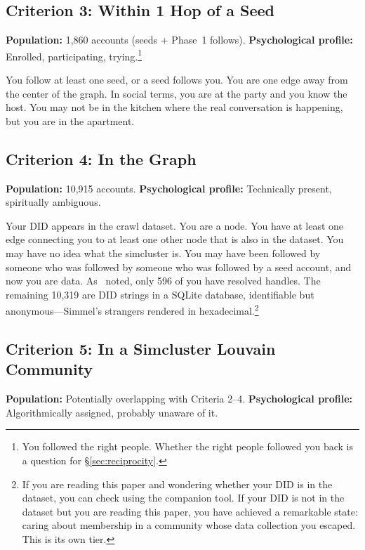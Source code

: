 \documentclass[11pt,a4paper]{article}
\begin{document}
\subsection*{Criterion 3: Within 1 Hop of a Seed}

\textbf{Population:} 1,860 accounts (seeds + Phase~1 follows). \textbf{Psychological profile:} Enrolled, participating, trying.\footnote{You followed the right people. Whether the right people followed you back is a question for \S\ref{sec:reciprocity}.}

You follow at least one seed, or a seed follows you. You are one edge away from the center of the graph. In social terms, you are at the party and you know the host. You may not be in the kitchen where the real conversation is happening, but you are in the apartment.

\subsection*{Criterion 4: In the Graph}

\textbf{Population:} 10,915 accounts. \textbf{Psychological profile:} Technically present, spiritually ambiguous.

Your DID appears in the crawl dataset. You are a node. You have at least one edge connecting you to at least one other node that is also in the dataset. You may have no idea what the simcluster is. You may have been followed by someone who was followed by someone who was followed by a seed account, and now you are data. As~\cite{simcluster-paper} noted, only 596 of you have resolved handles. The remaining 10,319 are DID strings in a SQLite database, identifiable but anonymous---Simmel's strangers rendered in hexadecimal.\footnote{If you are reading this paper and wondering whether your DID is in the dataset, you can check using the companion tool. If your DID is not in the dataset but you are reading this paper, you have achieved a remarkable state: caring about membership in a community whose data collection you escaped. This is its own tier.}

\subsection*{Criterion 5: In a Simcluster Louvain Community}

\textbf{Population:} Potentially overlapping with Criteria 2--4. \textbf{Psychological profile:} Algorithmically assigned, probably unaware of it.
\end{document}
